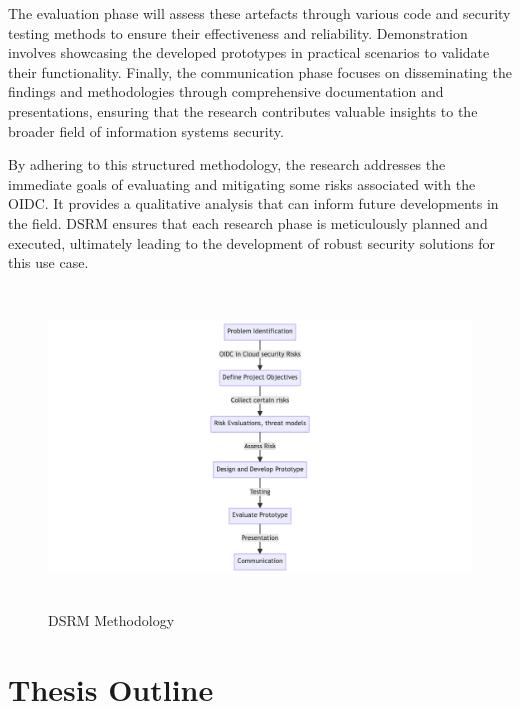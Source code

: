 The evaluation phase will assess these artefacts through various code and security testing methods to ensure their effectiveness and reliability. Demonstration involves showcasing the developed prototypes in practical scenarios to validate their functionality. Finally, the communication phase focuses on disseminating the findings and methodologies through comprehensive documentation and presentations, ensuring that the research contributes valuable insights to the broader field of information systems security.

By adhering to this structured methodology, the research addresses the immediate goals of evaluating and mitigating some risks associated with the OIDC. It provides a qualitative analysis that can inform future developments in the field. DSRM ensures that each research phase is meticulously planned and executed, ultimately leading to the development of robust security solutions for this use case.

\begin{figure}[h!]
\centering
\caption{DSRM Methodology}\label{fig:dsrm}
\includegraphics[width=\textwidth, height=320px]{pics/dsrm.png}
\end{figure}


\section{Thesis Outline}
